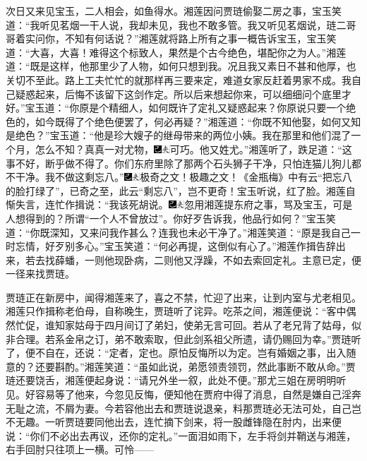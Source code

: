 次日又来见宝玉，二人相会，如鱼得水。湘莲因问贾琏偷娶二房之事，宝玉笑道：“我听见茗烟一干人说，我却未见，我也不敢多管。我又听见茗烟说，琏二哥哥着实问你，不知有何话说？”湘莲就将路上所有之事一概告诉宝玉，宝玉笑道：“大喜，大喜！难得这个标致人，果然是个古今绝色，堪配你之为人。”湘莲道：“既是这样，他那里少了人物，如何只想到我。况且我又素日不甚和他厚，也关切不至此。路上工夫忙忙的就那样再三要来定，难道女家反赶着男家不成。我自己疑惑起来，后悔不该留下这剑作定。所以后来想起你来，可以细细问个底里才好。”宝玉道：“你原是个精细人，如何既许了定礼又疑惑起来？你原说只要一个绝色的，如今既得了个绝色便罢了，何必再疑？”湘莲道：“你既不知他娶，如何又知是绝色？”宝玉道：“他是珍大嫂子的继母带来的两位小姨。我在那里和他们混了一个月，怎么不知？真真一对尤物，{\includegraphics[width=3mm]{../Images/00003}\includegraphics[width=3mm]{../Images/00012}\footnotesize \kaishu 可巧。}他又姓尤。”湘莲听了，跌足道：“这事不好，断乎做不得了。你们东府里除了那两个石头狮子干净，只怕连猫儿狗儿都不干净。我不做这剩忘八。”{\includegraphics[width=3mm]{../Images/00003}\includegraphics[width=3mm]{../Images/00012}\footnotesize \kaishu 极奇之文！极趣之文！《金瓶梅》中有云“把忘八的脸打绿了”，已奇之至，此云“剩忘八”，岂不更奇！}宝玉听说，红了脸。湘莲自惭失言，连忙作揖说：“我该死胡说。{\includegraphics[width=3mm]{../Images/00003}\includegraphics[width=3mm]{../Images/00012}\footnotesize \kaishu 忽用湘莲提东府之事，骂及宝玉，可是人想得到的？所谓“一个人不曾放过”。}你好歹告诉我，他品行如何？”宝玉笑道：“你既深知，又来问我作甚么？连我也未必干净了。”湘莲笑道：“原是我自己一时忘情，好歹别多心。”宝玉笑道：“何必再提，这倒似有心了。”湘莲作揖告辞出来，若去找薛蟠，一则他现卧病，二则他又浮躁，不如去索回定礼。主意已定，便一径来找贾琏。

贾琏正在新房中，闻得湘莲来了，喜之不禁，忙迎了出来，让到内室与尤老相见。湘莲只作揖称老伯母，自称晚生，贾琏听了诧异。吃茶之间，湘莲便说：“客中偶然忙促，谁知家姑母于四月间订了弟妇，使弟无言可回。若从了老兄背了姑母，似非合理。若系金帛之订，弟不敢索取，但此剑系祖父所遗，请仍赐回为幸。”贾琏听了，便不自在，还说：“定者，定也。原怕反悔所以为定。岂有婚姻之事，出入随意的？还要斟酌。”湘莲笑道：“虽如此说，弟愿领责领罚，然此事断不敢从命。”贾琏还要饶舌，湘莲便起身说：“请兄外坐一叙，此处不便。”那尤三姐在房明明听见。好容易等了他来，今忽见反悔，便知他在贾府中得了消息，自然是嫌自己淫奔无耻之流，不屑为妻。今若容他出去和贾琏说退亲，料那贾琏必无法可处，自己岂不无趣。一听贾琏要同他出去，连忙摘下剑来，将一股雌锋隐在肘内，出来便说：“你们不必出去再议，还你的定礼。”一面泪如雨下，左手将剑并鞘送与湘莲，右手回肘只往项上一横。可怜------

